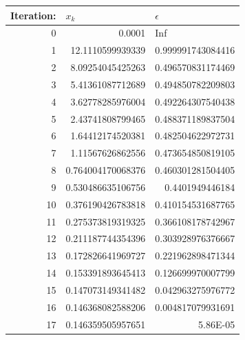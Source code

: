\documentclass[12pt]{extarticle}
\begin{document}
\begin{enumerate}
\begin{center}
\begin{tabular}{|r|r|r|}
\hline
\multicolumn{1}{|l|}{Iteration:} & \multicolumn{1}{l|}{$x_k$} & \multicolumn{1}{l|}{$\epsilon$} \\ \hline
0 & 0.0001 & \multicolumn{1}{l|}{Inf} \\ \hline
1 & 12.1110599939339 & 0.999991743084416 \\ \hline
2 & 8.09254045425263 & 0.496570831174469 \\ \hline
3 & 5.41361087712689 & 0.494850782209803 \\ \hline
4 & 3.62778285976004 & 0.492264307540438 \\ \hline
5 & 2.43741808799465 & 0.488371189837504 \\ \hline
6 & 1.64412174520381 & 0.482504622972731 \\ \hline
7 & 1.11567626862556 & 0.473654850819105 \\ \hline
8 & 0.764004170068376 & 0.460301281504405 \\ \hline
9 & 0.530486635106756 & 0.4401949446184 \\ \hline
10 & 0.376190426783818 & 0.410154531687765 \\ \hline
11 & 0.275373819319325 & 0.366108178742967 \\ \hline
12 & 0.211187744354396 & 0.303928976376667 \\ \hline
13 & 0.172826641969727 & 0.221962898471344 \\ \hline
14 & 0.153391893645413 & 0.126699970007799 \\ \hline
15 & 0.147073149341482 & 0.042963275976772 \\ \hline
16 & 0.146368082588206 & 0.004817079931691 \\ \hline
17 & 0.146359505957651 & 5.86E-05 \\ \hline
\end{tabular}
\label{}
\end{center}


\end{enumerate}
\end{document}
